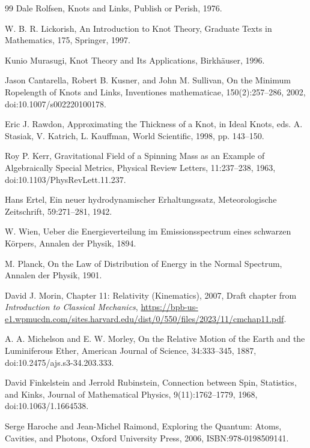 \documentclass[10pt,reprint,aps,onecolumn,nofootinbib]{revtex4-2}
\begin{document}
\begin{thebibliography}{99}
     Dale Rolfsen, Knots and Links, Publish or Perish, 1976.

     W. B. R. Lickorish, An Introduction to Knot Theory, Graduate Texts in Mathematics, 175, Springer, 1997.

     Kunio Murasugi, Knot Theory and Its Applications, Birkh{\"a}user, 1996.

     Jason Cantarella, Robert B. Kusner, and John M. Sullivan, On the Minimum Ropelength of Knots and Links, Inventiones mathematicae, 150(2):257--286, 2002, doi:10.1007/s002220100178.

     Eric J. Rawdon, Approximating the Thickness of a Knot, in Ideal Knots, eds. A. Stasiak, V. Katrich, L. Kauffman, World Scientific, 1998, pp. 143--150.

     Roy P. Kerr, Gravitational Field of a Spinning Mass as an Example of Algebraically Special Metrics, Physical Review Letters, 11:237--238, 1963, doi:10.1103/PhysRevLett.11.237.

     Hans Ertel, Ein neuer hydrodynamischer Erhaltungssatz, Meteorologische Zeitschrift, 59:271--281, 1942.

     W. Wien, Ueber die Energieverteilung im Emissionsspectrum eines schwarzen K{\"o}rpers, Annalen der Physik, 1894.

     M. Planck, On the Law of Distribution of Energy in the Normal Spectrum, Annalen der Physik, 1901.

     David J. Morin, Chapter 11: Relativity (Kinematics), 2007, Draft chapter from \emph{Introduction to Classical Mechanics}, \url{https://bpb-us-e1.wpmucdn.com/sites.harvard.edu/dist/0/550/files/2023/11/cmchap11.pdf}.

     A. A. Michelson and E. W. Morley, On the Relative Motion of the Earth and the Luminiferous Ether, American Journal of Science, 34:333--345, 1887, doi:10.2475/ajs.s3-34.203.333.

     David Finkelstein and Jerrold Rubinstein, Connection between Spin, Statistics, and Kinks, Journal of Mathematical Physics, 9(11):1762--1779, 1968, doi:10.1063/1.1664538.

     Serge Haroche and Jean-Michel Raimond, Exploring the Quantum: Atoms, Cavities, and Photons, Oxford University Press, 2006, ISBN:978-0198509141.


\end{thebibliography}
\end{document}
